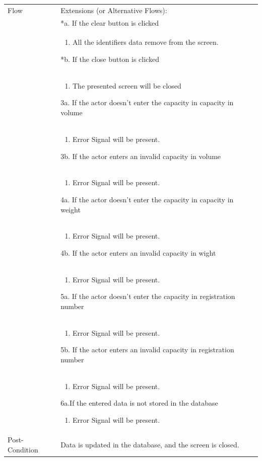 \documentclass[12pt,a4paper]{report}
\begin{document}
\begin{tabular}{ | m{3cm} | m{12cm}| } \hline
Flow & 
Extensions (or Alternative Flows):\\
& *a. If the clear button is clicked \\
& \begin{enumerate}
		\item All the identifiers data remove from the screen.
	\end{enumerate}
*b. If the close button is clicked\\
&	\begin{enumerate}
		\item The presented screen will be closed
	\end{enumerate}

3a. If the actor doesn't enter the capacity in capacity in volume\\ 	
&	\begin{enumerate}
		\item Error Signal will be present.
	\end{enumerate}
3b. If the actor enters an invalid capacity in volume \\ 	
&	\begin{enumerate}
		\item Error Signal will be present.
	\end{enumerate}
4a. If the actor doesn't enter the capacity in capacity in weight\\ 	
&	\begin{enumerate}
		\item Error Signal will be present.
	\end{enumerate}
4b. If the actor enters an invalid capacity in wight\\ 	
&	\begin{enumerate}
		\item Error Signal will be present.
	\end{enumerate}
5a. If the actor doesn't enter the capacity in registration number\\ 	
&	\begin{enumerate}
		\item Error Signal will be present.
	\end{enumerate}
5b. If the actor enters an invalid capacity in registration number\\ 	
&	\begin{enumerate}
		\item Error Signal will be present.
	\end{enumerate}
6a.If the entered data is not stored in the database  
\begin{enumerate}
		\item Error Signal will be present.
	\end{enumerate}
\\ \hline
Post-Condition &  Data is updated in the database, and the screen is closed. \\\hline
\end{tabular}
\end{document}
